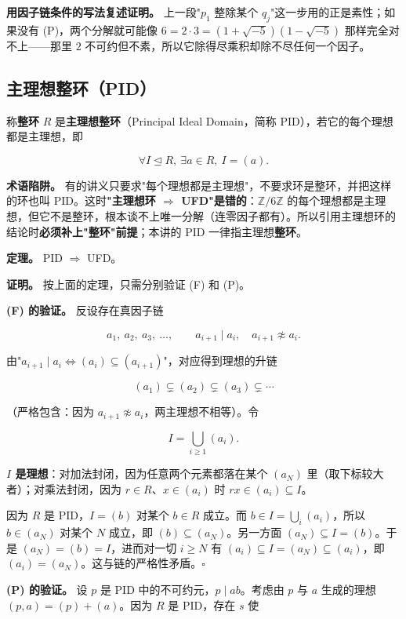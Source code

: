 \textbf{用因子链条件的写法复述证明。} 上一段"$p_1$ 整除某个 $q_j$"这一步用的正是素性；如果没有 (P)，两个分解就可能像 $6=2\cdot3=(1+\sqrt{-5})(1-\sqrt{-5})$ 那样完全对不上——那里 $2$ 不可约但不素，所以它除得尽乘积却除不尽任何一个因子。

\subsection{主理想整环（PID）}


称\textbf{整环} $R$ 是\textbf{主理想整环}（Principal Ideal Domain，简称 PID），若它的每个理想都是主理想，即

\[
\forall I\trianglelefteq R,\ \exists a\in R,\ I=(a).
\]

\textbf{术语陷阱。} 有的讲义只要求"每个理想都是主理想"，不要求环是整环，并把这样的环也叫 PID。这时\textbf{"主理想环 $\Rightarrow$ UFD"是错的}：$\mathbb Z/6\mathbb Z$ 的每个理想都是主理想，但它不是整环，根本谈不上唯一分解（连零因子都有）。所以引用主理想环的结论时\textbf{必须补上"整环"前提}；本讲的 PID 一律指主理想\textbf{整环}。

\textbf{定理。} PID $\Longrightarrow$ UFD。

\textbf{证明。} 按上面的定理，只需分别验证 (F) 和 (P)。

\textbf{(F) 的验证。} 反设存在真因子链

\[
a_1,\ a_2,\ a_3,\ \dots,\qquad a_{i+1}\mid a_i,\quad a_{i+1}\not\approx a_i .
\]

由"$a_{i+1}\mid a_i\iff(a_i)\subseteq(a_{i+1})$"，对应得到理想的升链

\[
(a_1)\subsetneq(a_2)\subsetneq(a_3)\subsetneq\cdots
\]

（严格包含：因为 $a_{i+1}\not\approx a_i$，两主理想不相等）。令

\[
I=\bigcup_{i\ge1}(a_i).
\]

\textbf{$I$ 是理想}：对加法封闭，因为任意两个元素都落在某个 $(a_N)$ 里（取下标较大者）；对乘法封闭，因为 $r\in R$、$x\in(a_i)$ 时 $rx\in(a_i)\subseteq I$。

因为 $R$ 是 PID，$I=(b)$ 对某个 $b\in R$ 成立。而 $b\in I=\bigcup_i(a_i)$，所以 $b\in(a_N)$ 对某个 $N$ 成立，即 $(b)\subseteq(a_N)$。另一方面 $(a_N)\subseteq I=(b)$。于是 $(a_N)=(b)=I$，进而对一切 $i\ge N$ 有 $(a_i)\subseteq I=(a_N)\subseteq(a_i)$，即 $(a_i)=(a_N)$。这与链的严格性矛盾。$\square$

\textbf{(P) 的验证。} 设 $p$ 是 PID 中的不可约元，$p\mid ab$。考虑由 $p$ 与 $a$ 生成的理想 $(p,a)=(p)+(a)$。因为 $R$ 是 PID，存在 $s$ 使

